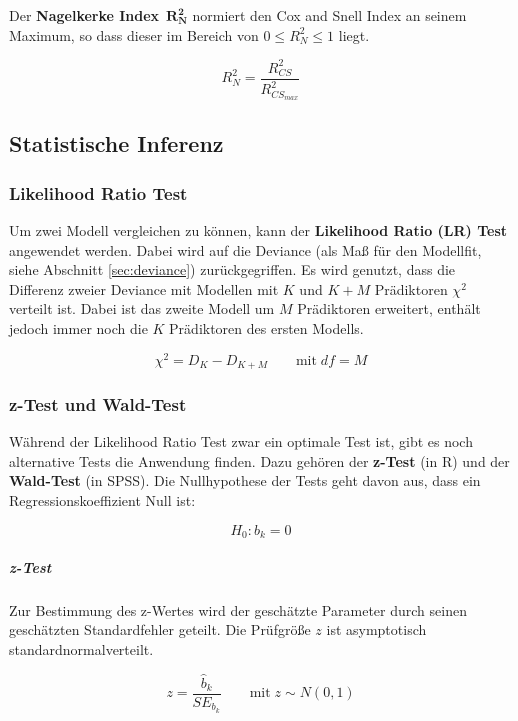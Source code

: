 \documentclass{article}
\numberwithin{equation}{section}
\begin{document}
Der \textbf{Nagelkerke Index}~$\mathbf{R^2_N}$ normiert den Cox and Snell Index an seinem Maximum, so dass dieser im Bereich von $0 \le R^2_N \le 1$ liegt.

\begin{equation}
R^2_N = \frac{R^2_{CS}}{R^2_{CS_{max}}}
\end{equation}

\subsection{Statistische Inferenz}

\subsubsection{Likelihood Ratio Test}

Um zwei Modell vergleichen zu können, kann der \textbf{Likelihood Ratio (LR) Test} angewendet werden. Dabei wird auf die Deviance (als Maß für den Modellfit, siehe Abschnitt \ref{sec:deviance}) zurückgegriffen. Es wird genutzt, dass die Differenz zweier Deviance mit Modellen mit $K$ und $K+M$ Prädiktoren $\chi^2$ verteilt ist. Dabei ist das zweite Modell um $M$ Prädiktoren erweitert, enthält jedoch immer noch die $K$ Prädiktoren des ersten Modells.

\begin{equation}
\chi^2 = D_K - D_{K+M} \qquad \text{mit} \; df=M
\end{equation}

\subsubsection{z-Test und Wald-Test}

Während der Likelihood Ratio Test zwar ein optimale Test ist, gibt es noch alternative Tests die Anwendung finden. Dazu gehören der \textbf{z-Test} (in R) und der \textbf{Wald-Test} (in SPSS). Die Nullhypothese der Tests geht davon aus, dass ein Regressionskoeffizient Null ist:

\begin{equation}
H_0: b_k = 0
\end{equation}

\subparagraph{z-Test}

Zur Bestimmung des z-Wertes wird der geschätzte Parameter durch seinen geschätzten Standardfehler geteilt. Die Prüfgröße $z$ ist asymptotisch standardnormalverteilt.

\begin{equation}
z = \frac{\hat b_k}{SE_{b_k}} \qquad \text{mit} \; z \sim N(0,1)
\end{equation}
\end{document}
